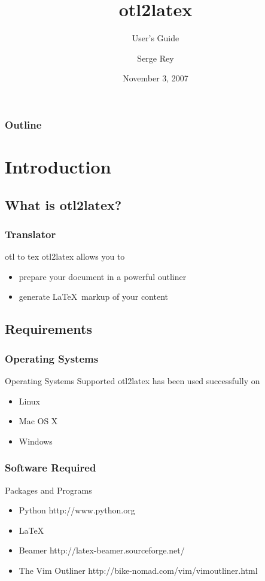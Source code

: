 \documentclass[nototal,handout]{beamer}
\author{Serge Rey}
\institute[sjsrey@gmail.com]{sjsrey@gmail.com}
\title[http://code.google.com/p/otl2latex/]{otl2latex}
\subtitle{User's Guide}
\date[otl2latex]{November 3, 2007}
\begin{document}
\begin{frame}
  \titlepage
\end{frame}
\begin{frame}
  \frametitle{Outline}
  \tableofcontents[pausesections]
\end{frame}



\section{Introduction} 

\subsection{What is otl2latex?} 

\begin{frame}
	\frametitle{Translator}
 
\begin{block}{otl to tex}
 otl2latex allows you to
 \begin{itemize}
 \item  prepare your document in a powerful outliner
 \item  generate \LaTeX\ markup of your content
 \end{itemize}
 \end{block} \end{frame} 

\subsection{Requirements} 

\begin{frame}
	\frametitle{Operating Systems}
 
\begin{block}{Operating Systems Supported}
 otl2latex has been used successfully on
 \begin{itemize}
 \item  Linux
 \item  Mac OS X
 \item  Windows
 \end{itemize}
 \end{block} \end{frame} 

\begin{frame}
	\frametitle{Software Required}
 
\begin{block}{Packages and Programs}
 \begin{itemize}
 \item  Python http://www.python.org
 \item  \LaTeX
 \item  Beamer http://latex-beamer.sourceforge.net/
 \item  The Vim Outliner http://bike-nomad.com/vim/vimoutliner.html 
 \end{itemize}
 \end{block} \end{frame} 
\end{document}
